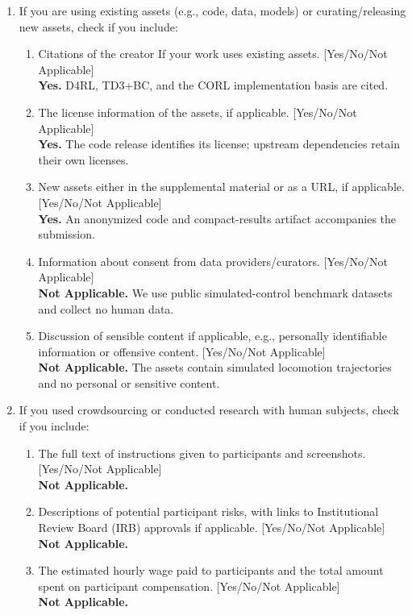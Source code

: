 \begin{enumerate}
  \item If you are using existing assets (e.g., code, data, models) or curating/releasing new assets, check if you include:
  \begin{enumerate}
    \item Citations of the creator If your work uses existing assets. [Yes/No/Not Applicable]\\
    \textbf{Yes.} D4RL, TD3+BC, and the CORL implementation basis are cited.
    \item The license information of the assets, if applicable. [Yes/No/Not Applicable]\\
    \textbf{Yes.} The code release identifies its license; upstream dependencies retain their own licenses.
    \item New assets either in the supplemental material or as a URL, if applicable. [Yes/No/Not Applicable]\\
    \textbf{Yes.} An anonymized code and compact-results artifact accompanies the submission.
    \item Information about consent from data providers/curators. [Yes/No/Not Applicable]\\
    \textbf{Not Applicable.} We use public simulated-control benchmark datasets and collect no human data.
    \item Discussion of sensible content if applicable, e.g., personally identifiable information or offensive content. [Yes/No/Not Applicable]\\
    \textbf{Not Applicable.} The assets contain simulated locomotion trajectories and no personal or sensitive content.
  \end{enumerate}

  \item If you used crowdsourcing or conducted research with human subjects, check if you include:
  \begin{enumerate}
    \item The full text of instructions given to participants and screenshots. [Yes/No/Not Applicable]\\
    \textbf{Not Applicable.}
    \item Descriptions of potential participant risks, with links to Institutional Review Board (IRB) approvals if applicable. [Yes/No/Not Applicable]\\
    \textbf{Not Applicable.}
    \item The estimated hourly wage paid to participants and the total amount spent on participant compensation. [Yes/No/Not Applicable]\\
    \textbf{Not Applicable.}
  \end{enumerate}

\end{enumerate}
